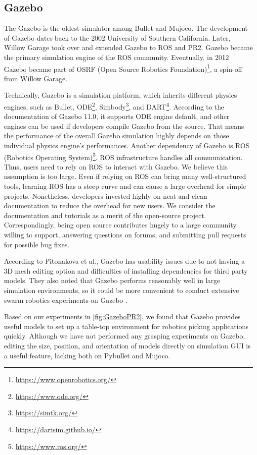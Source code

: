 \subsection{Gazebo}

The Gazebo is the oldest simulator among Bullet and Mujoco. The development of Gazebo dates back to the 2002 University of Southern California. Later, Willow Garage took over and extended Gazebo to ROS and PR2. Gazebo became the primary simulation engine of the ROS community. Eventually, in 2012 Gazebo became part of OSRF (Open Source Robotics Foundation)\footnote{\url{https://www.openrobotics.org/}}, a spin-off from Willow Garage.

Technically, Gazebo is a simulation platform, which inherits different physics engines, such as Bullet, ODE\footnote{\url{https://www.ode.org/}}, Simbody\footnote{\url{https://simtk.org/}}, and DART\footnote{\url{https://dartsim.github.io/}}. According to the documentation of Gazebo 11.0, it supports ODE engine default, and other engines can be used if developers compile Gazebo from the source. That means the performance of the overall Gazebo simulation highly depends on those individual physics engine's performances.  Another dependency of Gazebo is ROS (Robotics Operating System)\footnote{\url{https://www.ros.org/}}. ROS infrastructure handles all communication. Thus, users need to rely on ROS to interact with Gazebo. We believe this assumption is too large. Even if relying on ROS can bring many well-structured tools, learning ROS has a steep curve and can cause a large overhead for simple projects.
Nonetheless, developers invested highly on neat and clean documentation to reduce the overhead for new users. We consider the documentation and tutorials as a merit of the open-source project. Correspondingly, being open source contributes hugely to a large community willing to support, answering questions on forums, and submitting pull requests for possible bug fixes. 

According to Pitonakova et al., Gazebo has usability issues due to not having a 3D mesh editing option and difficulties of installing dependencies for third party models. They also noted that Gazebo performs reasonably well in large simulation environments, so it could be more convenient to conduct extensive swarm robotics experiments on Gazebo \cite{Pitonakova2018}.  

Based on our experiments in \ref{fig:GazeboPR2}, we found that Gazebo provides useful models to set up a table-top environment for robotics picking applications quickly. Although we have not performed any grasping experiments on Gazebo, editing the size, position, and orientation of models directly on simulation GUI is a useful feature, lacking both on Pybullet and Mujoco.


